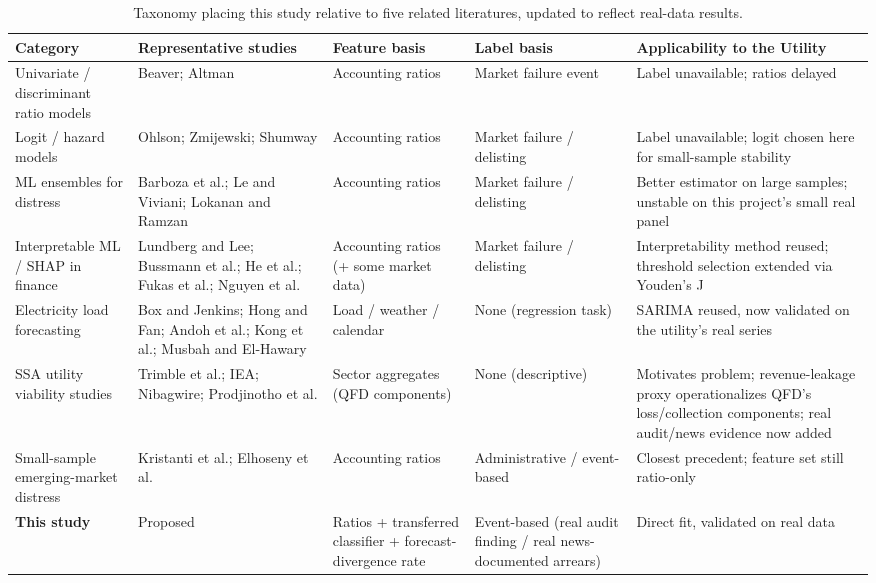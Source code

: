 \documentclass[final,1p,times]{elsarticle}
\begin{document}
\begin{table}[t]
\centering
\small
\caption{Taxonomy placing this study relative to five related literatures, updated to reflect real-data results.}
\label{tab:taxonomy}
\begin{tabular}{p{2.6cm} p{3.3cm} p{2.6cm} p{2.6cm} p{2.8cm}}
\toprule
\textbf{Category} & \textbf{Representative studies} & \textbf{Feature basis} & \textbf{Label basis} & \textbf{Applicability to the Utility} \\
\midrule
Univariate / discriminant ratio models & Beaver; Altman & Accounting ratios & Market failure event & Label unavailable; ratios delayed \\
Logit / hazard models & Ohlson; Zmijewski; Shumway & Accounting ratios & Market failure / delisting & Label unavailable; logit chosen here for small-sample stability \\
ML ensembles for distress & Barboza et al.; Le and Viviani; Lokanan and Ramzan & Accounting ratios & Market failure / delisting & Better estimator on large samples; unstable on this project's small real panel \\
Interpretable ML / SHAP in finance & Lundberg and Lee; Bussmann et al.; He et al.; Fukas et al.; Nguyen et al. & Accounting ratios (+ some market data) & Market failure / delisting & Interpretability method reused; threshold selection extended via Youden's J \\
Electricity load forecasting & Box and Jenkins; Hong and Fan; Andoh et al.; Kong et al.; Musbah and El-Hawary & Load / weather / calendar & None (regression task) & SARIMA reused, now validated on the utility's real series \\
SSA utility viability studies & Trimble et al.; IEA; Nibagwire; Prodjinotho et al. & Sector aggregates (QFD components) & None (descriptive) & Motivates problem; revenue-leakage proxy operationalizes QFD's loss/collection components; real audit/news evidence now added \\
Small-sample emerging-market distress & Kristanti et al.; Elhoseny et al. & Accounting ratios & Administrative / event-based & Closest precedent; feature set still ratio-only \\
\textbf{This study} & Proposed & Ratios + transferred classifier + forecast-divergence rate & Event-based (real audit finding / real news-documented arrears) & Direct fit, validated on real data \\
\bottomrule
\end{tabular}
\end{table}
\end{document}
